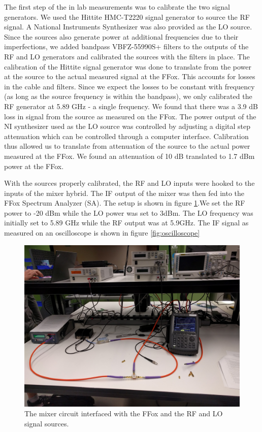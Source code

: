 \documentclass[twocolumn, aps, floatfix]{revtex4-1}
\begin{document}
The first step of the in lab measurements was to calibrate the two signal generators. We used the Hittite HMC-T2220 signal generator to source the RF signal. A National Instruments Synthesizer was also provided as the LO source. Since the sources also generate power at additional frequencies due to their imperfections, we added bandpass VBFZ-55990S+ filters to the outputs of the RF and LO generators and calibrated the sources with the filters in place. The calibration of the Hittite signal generator was done to translate from the power at the source to the actual measured signal at the FFox. This accounts for losses in the cable and filters. Since we expect the losses to be constant with frequency (as long as the source frequency is within the bandpass), we only calibrated the RF generator at 5.89 GHz - a single frequency. We found that there was a 3.9 dB loss in signal from the source as measured on the FFox. The power output of the NI synthesizer used as the LO source was controlled by adjusting a digital step attenuation which can be controlled through a computer interface. Calibration thus allowed us to translate from attenuation of the source to the actual power measured at the FFox. We found an attenuation of 10 dB translated to 1.7 dBm power at the FFox.

With the sources properly calibrated, the RF and LO inputs were hooked to the inputs of the  mixer hybrid. The IF output of the mixer was then fed into the FFox Spectrum Analyzer (SA). The setup is shown in figure \ref{fig:setup}.We set the RF power to -20 dBm while the LO power was set to 3dBm. The LO frequency was initially set to 5.89 GHz while the RF output was at 5.9GHz. The IF signal as measured on an oscilloscope is shown in figure \ref{fig:oscilloscope}
\begin{figure}[!htbp]
    \includegraphics[scale=0.05]{setup.jpg}
    \caption{The mixer circuit interfaced with the FFox and the RF and LO signal sources.}
    \label{fig:setup}
\end{figure}
\end{document}
